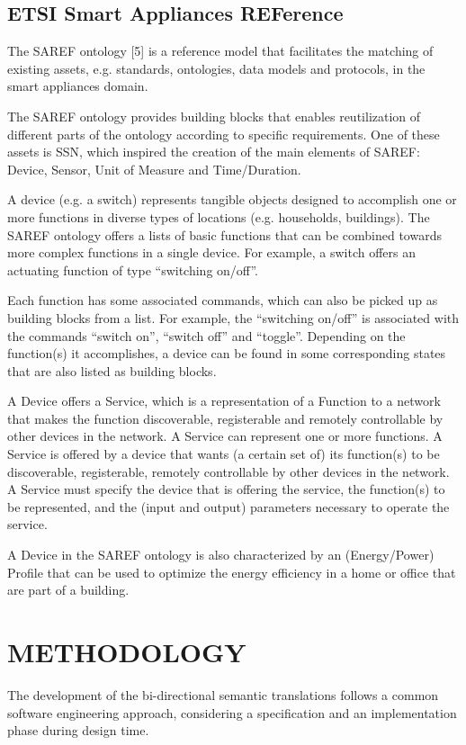 \documentclass{sig-alternate-05-2015}
\begin{document}
\subsection{ETSI Smart Appliances REFerence}
The SAREF ontology [5] is a reference model that facilitates the matching of existing assets, e.g. standards, ontologies, data models and protocols, in the smart appliances domain. 

The SAREF ontology provides building blocks that enables reutilization of different parts of the ontology according to specific requirements. One of these assets is SSN, which inspired the creation of the main elements of SAREF: Device, Sensor, Unit of Measure and Time/Duration. 

A device (e.g. a switch) represents tangible objects designed to accomplish one or more functions in diverse types of locations (e.g. households, buildings). The SAREF ontology offers a lists of basic functions that can be combined towards more complex functions in a single device. For example, a switch offers an actuating function of type “switching on/off”. 

Each function has some associated commands, which can also be picked up as building blocks from a list. For example, the “switching on/off” is associated with the commands “switch on”, “switch off” and “toggle”. Depending on the function(s) it accomplishes, a device can be found in some corresponding states that are also listed as building blocks. 

A Device offers a Service, which  is a representation of a Function to a network that makes the function discoverable, registerable and remotely controllable by other devices in the network. A Service can represent one or more functions. A Service is offered by a device that wants (a certain set of) its function(s) to be discoverable, registerable, remotely controllable by other devices in the network. A Service must specify the device that is offering the service, the function(s) to be represented, and the (input and output) parameters necessary to operate the service. 

A Device in the SAREF ontology is also characterized by an (Energy/Power) Profile that can be used to optimize the energy efficiency in a home or office that are part of a building.


\section{METHODOLOGY}
The development of the bi-directional semantic translations follows a common software engineering approach, considering a specification and an implementation phase during design time. 
\end{document}
